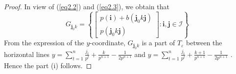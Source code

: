 \documentclass[12pt, reqno]{amsart}
\numberwithin{equation}{section}
\begin{document}
\begin{proof}
In view of (\ref{eq2.2}) and (\ref{eq2.3}), we obtain that
\begin{equation}\label{eq2.4}
G_{{\mathbf j}_0 k}=\left\{ \left[\begin{array}{c}
p({\mathbf i})+b({\mathbf j}_0 k{\mathbf j})\\
p({\mathbf j}_0 k{\mathbf j})
\end{array}\right]: {\mathbf i},{\mathbf j}\in {\mathcal I} \right\}
\end{equation}
From the expression of the $y$-coordinate, $G_{{\mathbf j}_0 k}$ is a part of $T_\varepsilon$ between the horizontal lines $y=\sum_{t=1}^{n}\frac{j_{t}}{p^t}+\frac{k}{p^{n+1}}-\frac{1}{2p^{n+1}}$ and
$y=\sum_{t=1}^{n}\frac{j_{t}}{p^t}+\frac{k+1}{p^{n+1}}-\frac{1}{2p^{n+1}}$ . Hence the part (i) follows.


\end{proof}
\end{document}
